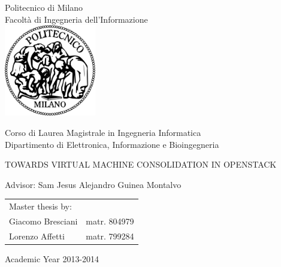 \begin{titlepage}
\vspace*{-2.5cm}
\bfseries

\begin{center}
\LARGE
Politecnico di Milano\\
\Large
Facolt\`{a} di Ingegneria dell'Informazione\\
\vspace{0.5cm}
\includegraphics[width=4cm]{images/logo_polimi.png}
\vspace*{1cm}


\begin{large}
Corso di Laurea Magistrale in Ingegneria Informatica\\
Dipartimento di Elettronica, Informazione e Bioingegneria\\
\end{large}

\vspace{1.0cm}
\begin{Large}
\uppercase{Towards Virtual Machine Consolidation in OpenStack}\\
\end{Large}  
\end{center}

\vspace*{1cm}
\large
\begin{flushleft}
\hspace{-2cm}  Advisor: Sam Jesus Alejandro Guinea Montalvo\\
\end{flushleft}
\vspace*{1.5cm}

\hspace{5.5cm}
\parbox{10cm}{
    \begin{tabular}{ll}
         Master thesis by: & \\
         Giacomo Bresciani & matr. 804979\\
         Lorenzo Affetti & matr. 799284 \\
    \end{tabular}
}

\vspace*{1.5cm}
\begin{center}
  Academic Year 2013-2014
\end{center}

\end{titlepage}
\cleardoublepage

